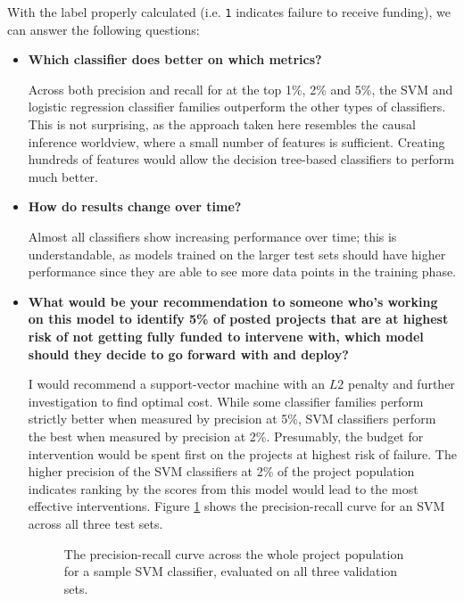\documentclass[11pt]{article}
\begin{document}
With the label properly calculated (i.e. \texttt{1} indicates failure to receive funding), we can answer the following questions: 

\begin{itemize}
\item \textbf{Which classifier does better on which metrics?}

Across both precision and recall for at the top 1\%, 2\% and 5\%, the SVM and logistic regression classifier families outperform the other types of classifiers. This is not surprising, as the approach taken here resembles the causal inference worldview, where a small number of features is sufficient. Creating hundreds of features would allow the decision tree-based classifiers to perform much better.

\item \textbf{How do results change over time?}

Almost all classifiers show increasing performance over time; this is understandable, as models trained on the larger test sets should have higher performance since they are able to see more data points in the training phase. 
\item \textbf{What would be your recommendation to someone who's working on this model to identify 5\% of posted projects that are at highest risk of not getting fully funded to intervene with, which model should they decide to go forward with and deploy?} 

I would recommend a support-vector machine with an $L2$ penalty and further investigation to find optimal cost. While some classifier families perform strictly better when measured by precision at 5\%, SVM classifiers perform the best when measured by precision at 2\%. Presumably, the budget for intervention would be spent first on the projects at highest risk of failure. The higher precision of the SVM classifiers at 2\% of the project population indicates ranking by the scores from this model would lead to the most effective interventions. Figure \ref{pr} shows the precision-recall curve for an SVM across all three test sets.

\begin{figure}[H]
\centering \label{pr}

\caption{The precision-recall curve across the whole project population for a sample SVM classifier, evaluated on all three validation sets.}
\end{figure}


\end{itemize}
\end{document}
